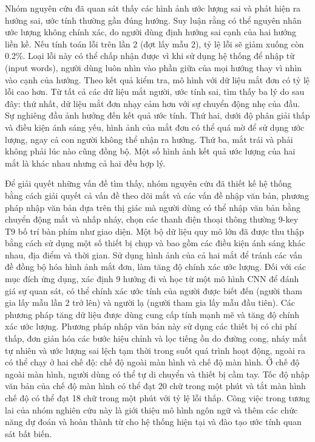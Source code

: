 Nhóm nguyên cứu đã quan sát thấy các hình ảnh ước lượng sai và phát hiện ra hướng sai, ước tính thường gần đúng hướng. Suy luận rằng có thể nguyên nhân ước lượng không chính xác, do người dùng định hướng sai cạnh của hai hướng liền kề. Nếu tính toán lỗi trên lần 2 (đợt lấy mẫu 2), tỷ lệ lỗi sẽ giảm xuống còn 0.2\%. Loại lỗi này có thể chấp nhận được vì khi sử dụng hệ thống để nhập từ (input words), người dùng luôn nhìn vào phần giữa của mọi hướng thay vì nhìn vào cạnh của hướng. Theo kết quả kiểm tra, mô hình với dữ liệu mắt đơn có tỷ lệ lỗi cao hơn. Từ tất cả các dữ liệu mắt người, ước tính sai, tìm thấy ba lý do sau đây: thứ nhất, dữ liệu mắt đơn nhạy cảm hơn với sự chuyển động nhẹ của đầu. Sự nghiêng đầu ảnh hưởng đến kết quả ước tính. Thứ hai, dưới độ phân giải thấp và điều kiện ánh sáng yếu, hình ảnh của mắt đơn có thể quá mờ để sử dụng ước lượng, ngay cả con người không thể nhận ra hướng. Thứ ba, mắt trái và phải không phải lúc nào cũng đồng bộ. Một số hình ảnh kết quả ước lượng của hai mắt là khác nhau nhưng cả hai đều hợp lý.

Để giải quyết những vấn đề tìm thấy, nhóm nguyên cứu đã thiết kế hệ thống bằng cách giải quyết cả vấn đề theo dõi mắt và các vấn đề nhập văn bản, phương pháp nhập văn bản dựa trên thị giác mà người dùng có thể nhập văn bản bằng chuyển động mắt và nhấp nháy, chọn các thanh điện thoại thông thường 9-key T9 bố trí bàn phím như giao diện. Một bộ dữ liệu quy mô lớn đã được thu thập bằng cách sử dụng một số thiết bị chụp và bao gồm các điều kiện ánh sáng khác nhau, địa điểm và thời gian. Sử dụng hình ảnh của cả hai mắt để tránh các vấn đề đồng bộ hóa hình ảnh mắt đơn, làm tăng độ chính xác ước lượng. Đối với các mục đích ứng dụng, xác định 9 hướng đi và học từ một mô hình CNN để đánh giá sự quan sát, có thể chính xác ước tính của người được biết đến (người tham gia lấy mẫu lần 2 trở lên) và người lạ (người tham gia lấy mẫu đầu tiên). Các phương pháp tăng dữ liệu được dùng cung cấp tính mạnh mẽ và tăng độ chính xác ước lượng. Phương pháp nhập văn bản này sử dụng các thiết bị có chi phí thấp, đơn giản hóa các bước hiệu chỉnh và lọc tiếng ồn do đường cong, nháy mắt tự nhiên và ước lượng sai lệch tạm thời trong suốt quá trình hoạt động, ngoài ra có thể chạy ở hai chế độ: chế độ ngoài màn hình và chế độ màn hình. Ở chế độ ngoài màn hình, người dùng có thể tự di chuyển và thiết bị cầm tay. Tốc độ nhập văn bản của chế độ màn hình có thể đạt 20 chữ trong một phút và tắt màn hình chế độ có thể đạt 18 chữ trong một phút với tỷ lệ lỗi thấp. Công việc trong tương lai của nhóm nghiên cứu này là giới thiệu mô hình ngôn ngữ và thêm các chức năng dự đoán và hoàn thành từ cho hệ thống hiện tại và đào tạo ước tính quan sát bất biến.
